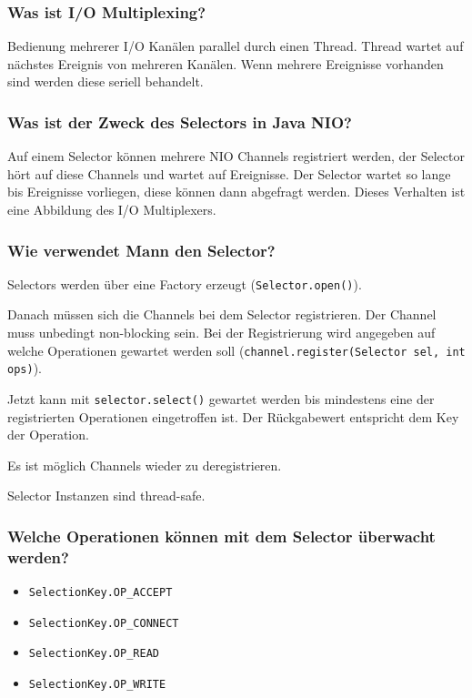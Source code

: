 \documentclass[10pt,a4paper]{scrartcl}
\begin{document}
\subsubsection{Was ist I/O Multiplexing?}

Bedienung mehrerer I/O Kanälen parallel durch einen Thread. Thread wartet auf nächstes Ereignis von
mehreren Kanälen. Wenn mehrere Ereignisse vorhanden sind werden diese seriell behandelt.
  
\subsubsection{Was ist der Zweck des Selectors in Java NIO?}

Auf einem Selector können mehrere NIO Channels registriert werden, der Selector hört auf diese
Channels und wartet auf Ereignisse. Der Selector wartet so lange bis Ereignisse vorliegen, diese
können dann abgefragt werden. Dieses Verhalten ist eine Abbildung des I/O Multiplexers.
  
\subsubsection{Wie verwendet Mann den Selector?}

Selectors werden über eine Factory erzeugt (\texttt{Selector.open()}).

Danach müssen sich die Channels bei dem Selector registrieren. Der Channel muss unbedingt
non-blocking sein. Bei der Registrierung wird angegeben auf welche Operationen gewartet werden soll
(\texttt{channel.register(Selector sel, int ops)}). 

Jetzt kann mit \texttt{selector.select()} gewartet werden bis mindestens eine der registrierten
Operationen eingetroffen ist. Der Rückgabewert entspricht dem Key der Operation.

Es ist möglich Channels wieder zu deregistrieren.

Selector Instanzen sind thread-safe.
  
\subsubsection{Welche Operationen können mit dem Selector überwacht werden?}

\begin{itemize}
	\item \texttt{SelectionKey.OP\_ACCEPT}
	\item \texttt{SelectionKey.OP\_CONNECT}
	\item \texttt{SelectionKey.OP\_READ}
	\item \texttt{SelectionKey.OP\_WRITE}
\end{itemize}
\end{document}
